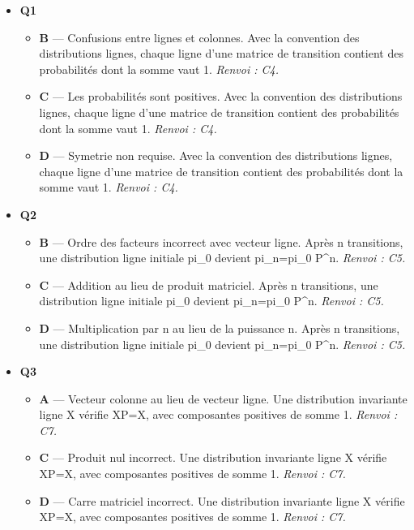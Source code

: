 \begin{itemize}
  \item \textbf{Q1}
  \begin{itemize}
    \item \textbf{B} — Confusions entre lignes et colonnes. Avec la convention des distributions lignes, chaque ligne d'une matrice de transition contient des probabilités dont la somme vaut 1. \emph{Renvoi : C4.}
    \item \textbf{C} — Les probabilités sont positives. Avec la convention des distributions lignes, chaque ligne d'une matrice de transition contient des probabilités dont la somme vaut 1. \emph{Renvoi : C4.}
    \item \textbf{D} — Symetrie non requise. Avec la convention des distributions lignes, chaque ligne d'une matrice de transition contient des probabilités dont la somme vaut 1. \emph{Renvoi : C4.}
  \end{itemize}
  \item \textbf{Q2}
  \begin{itemize}
    \item \textbf{B} — Ordre des facteurs incorrect avec vecteur ligne. Après n transitions, une distribution ligne initiale pi\_0 devient pi\_n=pi\_0 P\textasciicircum{}n. \emph{Renvoi : C5.}
    \item \textbf{C} — Addition au lieu de produit matriciel. Après n transitions, une distribution ligne initiale pi\_0 devient pi\_n=pi\_0 P\textasciicircum{}n. \emph{Renvoi : C5.}
    \item \textbf{D} — Multiplication par n au lieu de la puissance n. Après n transitions, une distribution ligne initiale pi\_0 devient pi\_n=pi\_0 P\textasciicircum{}n. \emph{Renvoi : C5.}
  \end{itemize}
  \item \textbf{Q3}
  \begin{itemize}
    \item \textbf{A} — Vecteur colonne au lieu de vecteur ligne. Une distribution invariante ligne X vérifie XP=X, avec composantes positives de somme 1. \emph{Renvoi : C7.}
    \item \textbf{C} — Produit nul incorrect. Une distribution invariante ligne X vérifie XP=X, avec composantes positives de somme 1. \emph{Renvoi : C7.}
    \item \textbf{D} — Carre matriciel incorrect. Une distribution invariante ligne X vérifie XP=X, avec composantes positives de somme 1. \emph{Renvoi : C7.}
  \end{itemize}

\end{itemize}
